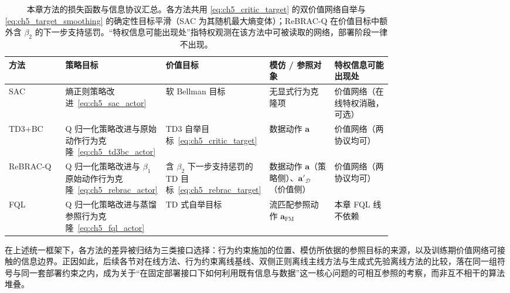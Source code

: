 \begin{table}[t]
\centering
\caption{本章方法的损失函数与信息协议汇总。各方法共用 \eqref{eq:ch5_critic_target} 的双价值网络自举与 \eqref{eq:ch5_target_smoothing} 的确定性目标平滑（SAC 为其随机最大熵变体）；ReBRAC-Q 在价值目标中额外含 $\beta_2$ 的下一步支持惩罚。“特权信息可能出现处”指特权观测在该方法中可被读取的网络，部署阶段一律不出现。}
\label{tab:ch5_method_loss}
\setlength{\tabcolsep}{4pt}
\begin{tabular}{l >{\raggedright\arraybackslash}p{0.26\linewidth} >{\raggedright\arraybackslash}p{0.18\linewidth} >{\raggedright\arraybackslash}p{0.17\linewidth} >{\raggedright\arraybackslash}p{0.15\linewidth}}
\toprule
\textbf{方法} & \textbf{策略目标} & \textbf{价值目标} & \textbf{模仿 / 参照对象} & \textbf{特权信息可能出现处} \\
\midrule
SAC & 熵正则策略改进~\eqref{eq:ch5_sac_actor} & 软 Bellman 目标 & 无显式行为克隆项 & 价值网络（在线特权消融，可选） \\
TD3+BC & Q 归一化策略改进与原始动作行为克隆~\eqref{eq:ch5_td3bc_actor} & TD3 自举目标~\eqref{eq:ch5_critic_target} & 数据动作 $\mathbf{a}$ & 价值网络（两协议均可） \\
ReBRAC-Q & Q 归一化策略改进与 $\beta_1$ 原始动作行为克隆~\eqref{eq:ch5_rebrac_actor} & 含 $\beta_2$ 下一步支持惩罚的 TD 目标~\eqref{eq:ch5_rebrac_target} & 数据动作 $\mathbf{a}$（策略侧）、$\mathbf{a}'_{\mathcal D}$（价值侧） & 价值网络（两协议均可） \\
FQL & Q 归一化策略改进与蒸馏参照行为克隆~\eqref{eq:ch5_fql_actor} & TD 式自举目标 & 流匹配参照动作 $\mathbf{a}_{\mathrm{FM}}$ & 本章 FQL 线不依赖 \\
\bottomrule
\end{tabular}
\end{table}

在上述统一框架下，各方法的差异被归结为三类接口选择：行为约束施加的位置、模仿所依据的参照目标的来源，以及训练期价值网络可接触的信息边界。正因如此，后续各节对在线方法、行为约束离线基线、双侧正则离线主线方法与生成式先验离线方法的比较，落在同一组符号与同一套部署约束之内，成为关于“在固定部署接口下如何利用既有信息与数据”这一核心问题的可相互参照的考察，而非互不相干的算法堆叠。

\clearpage
